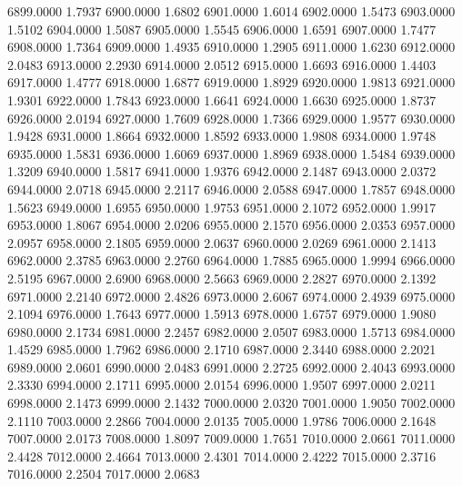 6899.0000      1.7937
6900.0000      1.6802
6901.0000      1.6014
6902.0000      1.5473
6903.0000      1.5102
6904.0000      1.5087
6905.0000      1.5545
6906.0000      1.6591
6907.0000      1.7477
6908.0000      1.7364
6909.0000      1.4935
6910.0000      1.2905
6911.0000      1.6230
6912.0000      2.0483
6913.0000      2.2930
6914.0000      2.0512
6915.0000      1.6693
6916.0000      1.4403
6917.0000      1.4777
6918.0000      1.6877
6919.0000      1.8929
6920.0000      1.9813
6921.0000      1.9301
6922.0000      1.7843
6923.0000      1.6641
6924.0000      1.6630
6925.0000      1.8737
6926.0000      2.0194
6927.0000      1.7609
6928.0000      1.7366
6929.0000      1.9577
6930.0000      1.9428
6931.0000      1.8664
6932.0000      1.8592
6933.0000      1.9808
6934.0000      1.9748
6935.0000      1.5831
6936.0000      1.6069
6937.0000      1.8969
6938.0000      1.5484
6939.0000      1.3209
6940.0000      1.5817
6941.0000      1.9376
6942.0000      2.1487
6943.0000      2.0372
6944.0000      2.0718
6945.0000      2.2117
6946.0000      2.0588
6947.0000      1.7857
6948.0000      1.5623
6949.0000      1.6955
6950.0000      1.9753
6951.0000      2.1072
6952.0000      1.9917
6953.0000      1.8067
6954.0000      2.0206
6955.0000      2.1570
6956.0000      2.0353
6957.0000      2.0957
6958.0000      2.1805
6959.0000      2.0637
6960.0000      2.0269
6961.0000      2.1413
6962.0000      2.3785
6963.0000      2.2760
6964.0000      1.7885
6965.0000      1.9994
6966.0000      2.5195
6967.0000      2.6900
6968.0000      2.5663
6969.0000      2.2827
6970.0000      2.1392
6971.0000      2.2140
6972.0000      2.4826
6973.0000      2.6067
6974.0000      2.4939
6975.0000      2.1094
6976.0000      1.7643
6977.0000      1.5913
6978.0000      1.6757
6979.0000      1.9080
6980.0000      2.1734
6981.0000      2.2457
6982.0000      2.0507
6983.0000      1.5713
6984.0000      1.4529
6985.0000      1.7962
6986.0000      2.1710
6987.0000      2.3440
6988.0000      2.2021
6989.0000      2.0601
6990.0000      2.0483
6991.0000      2.2725
6992.0000      2.4043
6993.0000      2.3330
6994.0000      2.1711
6995.0000      2.0154
6996.0000      1.9507
6997.0000      2.0211
6998.0000      2.1473
6999.0000      2.1432
7000.0000      2.0320
7001.0000      1.9050
7002.0000      2.1110
7003.0000      2.2866
7004.0000      2.0135
7005.0000      1.9786
7006.0000      2.1648
7007.0000      2.0173
7008.0000      1.8097
7009.0000      1.7651
7010.0000      2.0661
7011.0000      2.4428
7012.0000      2.4664
7013.0000      2.4301
7014.0000      2.4222
7015.0000      2.3716
7016.0000      2.2504
7017.0000      2.0683
